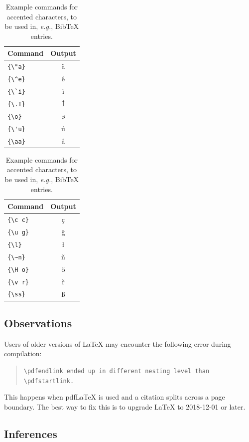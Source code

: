 \documentclass[9pt]{article}
\begin{document}
\begin{table}
\centering
\begin{tabular}{lc}
\hline
\textbf{Command} & \textbf{Output}\\
\hline
\verb|{\"a}| & {\"a} \\
\verb|{\^e}| & {\^e} \\
\verb|{\`i}| & {\`i} \\ 
\verb|{\.I}| & {\.I} \\ 
\verb|{\o}| & {\o} \\
\verb|{\'u}| & {\'u}  \\ 
\verb|{\aa}| & {\aa}  \\\hline
\end{tabular}
\begin{tabular}{lc}
\hline
\textbf{Command} & \textbf{Output}\\
\hline
\verb|{\c c}| & {\c c} \\ 
\verb|{\u g}| & {\u g} \\ 
\verb|{\l}| & {\l} \\ 
\verb|{\~n}| & {\~n} \\ 
\verb|{\H o}| & {\H o} \\ 
\verb|{\v r}| & {\v r} \\ 
\verb|{\ss}| & {\ss} \\
\hline
\end{tabular}
\caption{Example commands for accented characters, to be used in, \emph{e.g.}, Bib\TeX{} entries.}
\label{tab:accents}
\end{table}

\subsection{Observations}

Users of older versions of \LaTeX{} may encounter the following error during compilation: 
\begin{quote}
\tt\verb|\pdfendlink| ended up in different nesting level than \verb|\pdfstartlink|.
\end{quote}
This happens when pdf\LaTeX{} is used and a citation splits across a page boundary. The best way to fix this is to upgrade \LaTeX{} to 2018-12-01 or later.

\subsection{Inferences}
\end{document}
